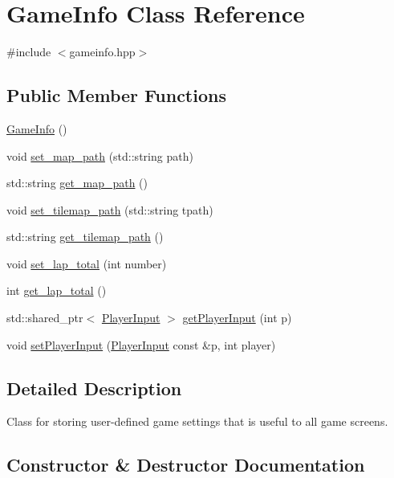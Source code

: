 \hypertarget{classGameInfo}{}\section{Game\+Info Class Reference}
\label{classGameInfo}


{\ttfamily \#include $<$gameinfo.\+hpp$>$}

\subsection*{Public Member Functions}
\begin{DoxyCompactItemize}
\item 
\hyperlink{classGameInfo_ae7ded63bd69b007847bd66debaeebc23}{Game\+Info} ()
\item 
void \hyperlink{classGameInfo_a4269ef3313bbf20946f47bbd1c272b6d}{set\+\_\+map\+\_\+path} (std\+::string path)
\item 
std\+::string \hyperlink{classGameInfo_aa9c66670430c8ce52125cea87b6c38a5}{get\+\_\+map\+\_\+path} ()
\item 
void \hyperlink{classGameInfo_aedb1dce53ebf765683a71d57b65c6cef}{set\+\_\+tilemap\+\_\+path} (std\+::string tpath)
\item 
std\+::string \hyperlink{classGameInfo_a4a3618e3691078217e3bec548bcf40cc}{get\+\_\+tilemap\+\_\+path} ()
\item 
void \hyperlink{classGameInfo_a1c348163ac323c617b0306f946d17baa}{set\+\_\+lap\+\_\+total} (int number)
\item 
int \hyperlink{classGameInfo_ab8f5a3a0d1aa460ed0956f211bbc445c}{get\+\_\+lap\+\_\+total} ()
\item 
std\+::shared\+\_\+ptr$<$ \hyperlink{classPlayerInput}{Player\+Input} $>$ \hyperlink{classGameInfo_a4c6bf794f57e952748633c7897d4741d}{get\+Player\+Input} (int p)
\item 
void \hyperlink{classGameInfo_ae4d8a51be4f8d55b177e2fdadb5e4860}{set\+Player\+Input} (\hyperlink{classPlayerInput}{Player\+Input} const \&p, int player)
\end{DoxyCompactItemize}


\subsection{Detailed Description}
Class for storing user-\/defined game settings that is useful to all game screens. 

\subsection{Constructor \& Destructor Documentation}
\hypertarget{classGameInfo_ae7ded63bd69b007847bd66debaeebc23}{}\label{classGameInfo_ae7ded63bd69b007847bd66debaeebc23} 
